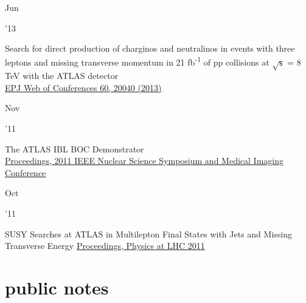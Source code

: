 \documentclass[]{cv} %
\begin{document}
\begin{entrylist}

  \entry
  {\parbox[t]{\parboxWidthOne}{Jun}\parbox[t]{\parboxWidthTwo}{\hfill '13}}
  {Search for direct production of charginos and neutralinos in events with
  three leptons and missing transverse momentum in 21 fb\textsuperscript{-1} of
  pp collisions at $\sqrt{\mathsf{s}}$ = 8 TeV with the ATLAS detector\\}
  {\href{https://doi.org/10.1051/epjconf/20136020040}{EPJ Web of Conferences 60, 20040 (2013)}}
  {\vspace*{\spacingPubs}}

  \entry
  {\parbox[t]{\parboxWidthOne}{Nov}\parbox[t]{\parboxWidthTwo}{\hfill '11}}
  {The ATLAS IBL BOC Demonstrator\\}
  {\href{http://ieeexplore.ieee.org/xpl/mostRecentIssue.jsp?punumber=6144196}{Proceedings, 2011 IEEE Nuclear Science Symposium and Medical Imaging Conference}}
  {\vspace*{\spacingPubs}}

  \entry
  {\parbox[t]{\parboxWidthOne}{Oct}\parbox[t]{\parboxWidthTwo}{\hfill '11}}
  {SUSY Searches at ATLAS in Multilepton Final States with Jets and Missing Transverse Energy}
  {\href{http://www.slac.stanford.edu/econf/C1106061}{Proceedings, Physics at LHC 2011}}
  {\vspace*{\spacingPubs}}

\end{entrylist}

\section{public notes}
\end{document}
